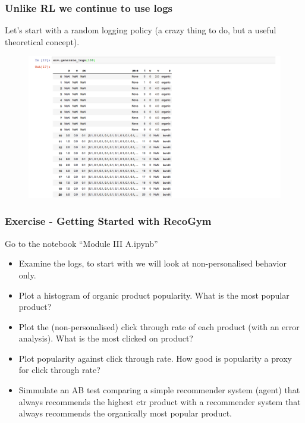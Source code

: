    \begin{frame}
    \frametitle{Unlike RL we continue to use logs}
   
    Let's start with a random logging policy (a crazy thing to do, but a useful theoretical concept).
    
     \begin{figure}[h!]
       \includegraphics[scale=0.3]{images/recogymlog.png}
         \centering
         \label{motex1}
     \end{figure}
  \end{frame}


  \begin{frame}
    \frametitle{Exercise - Getting Started with RecoGym}

    Go to the notebook ``Module III A.ipynb''
\begin{itemize}
  \item Examine the logs, to start with we will look at non-personalised behavior only.
  \item Plot a histogram of organic product popularity. What is the most popular product?  
  \item Plot the (non-personalised) click through rate of each product (with an error analysis).  What is the most clicked on product?
  \item Plot popularity against click through rate.  How good is popularity a proxy for click through rate?
  \item Simmulate an AB test comparing a simple recommender system (agent) that always recommends the highest ctr product with a recommender system that always recommends the organically most popular product.
\end{itemize}
\end{frame}

